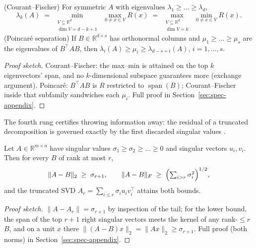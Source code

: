 \begin{theorem}\label{thm:spec-interlace}
(Courant--Fischer) For symmetric $A$ with eigenvalues $\lambda_1 \ge \dots \ge
\lambda_d$,
\[
\lambda_k(A) \;=\; \min_{\substack{V \subseteq \mathbb{R}^d\\ \dim V = d-k+1}}
\;\max_{0 \ne x \in V} R(x)
\;=\; \max_{\substack{V \subseteq \mathbb{R}^d\\ \dim V = k}}
\;\min_{0 \ne x \in V} R(x).
\]
(Poincar\'e separation) If $B \in \mathbb{R}^{d \times s}$ has orthonormal
columns and $\mu_1 \ge \dots \ge \mu_s$ are the eigenvalues of
$B^{\top}\!A B$, then $\lambda_i(A) \ge \mu_i \ge \lambda_{d-s+i}(A)$,
$i = 1,\dots,s$. \eop
\end{theorem}

\begin{proof}[Proof sketch]
Courant--Fischer: the max--min is attained on the top $k$ eigenvectors' span,
and no $k$-dimensional subspace guarantees more (exchange argument).
Poincar\'e: $B^{\top}\!A B$ is $R$ restricted to $\operatorname{span}(B)$;
Courant--Fischer inside that subfamily sandwiches each $\mu_i$. Full proof
in Section~\ref{sec:spec-appendix}.
\end{proof}

The fourth rung certifies throwing information away: the residual of a
truncated decomposition is governed exactly by the first discarded singular
values \citep{spectral-matrix-bg1,spectral-matrix-bg3,spectral-matrix-bg4}.

\begin{theorem}\label{thm:spec-eym}
Let $A \in \mathbb{R}^{m \times n}$ have singular values $\sigma_1 \ge
\sigma_2 \ge \dots \ge 0$ and singular vectors $u_i, v_i$. Then for every $B$
of rank at most $r$,
\[
\|A - B\|_2 \;\ge\; \sigma_{r+1},
\qquad
\|A - B\|_F \;\ge\; \Bigl(\textstyle\sum_{i > r} \sigma_i^2\Bigr)^{1/2},
\]
and the truncated SVD $A_r = \sum_{i \le r} \sigma_i u_i v_i^{\top}$ attains
both bounds. \eop
\end{theorem}

\begin{proof}[Proof sketch]
$\|A - A_r\| = \sigma_{r+1}$ by inspection of the tail; for the lower bound,
the span of the top $r+1$ right singular vectors meets the kernel of any
rank-$\le r$ $B$, and on a unit $x$ there $\|(A-B)x\|_2 = \|Ax\|_2 \ge
\sigma_{r+1}$. Full proof (both norms) in Section~\ref{sec:spec-appendix}.
\end{proof}

